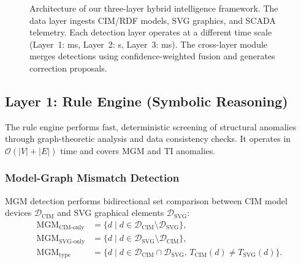 \documentclass[research]{fcs}
\begin{document}
\begin{figure}[htbp]
\caption{\small Architecture of our three-layer hybrid intelligence framework. The data layer ingests CIM/RDF models, SVG graphics, and SCADA telemetry. Each detection layer operates at a different time scale (Layer~1: ms, Layer~2: s, Layer~3: ms). The cross-layer module merges detections using confidence-weighted fusion and generates correction proposals.}
\label{fig:framework}
\end{figure}

\subsection{Layer 1: Rule Engine (Symbolic Reasoning)}

The rule engine performs fast, deterministic screening of structural anomalies through graph-theoretic analysis and data consistency checks. It operates in $\mathcal{O}(|V| + |E|)$ time and covers MGM and TI anomalies.

\subsubsection{Model-Graph Mismatch Detection}

MGM detection performs bidirectional set comparison between CIM model devices $\mathcal{D}_{\text{CIM}}$ and SVG graphical elements $\mathcal{D}_{\text{SVG}}$:
\begin{align}
\text{MGM}_{\text{CIM-only}} &= \{d \mid d \in \mathcal{D}_{\text{CIM}} \setminus \mathcal{D}_{\text{SVG}}\}, \\
\text{MGM}_{\text{SVG-only}} &= \{d \mid d \in \mathcal{D}_{\text{SVG}} \setminus \mathcal{D}_{\text{CIM}}\}, \\
\text{MGM}_{\text{type}} &= \{d \mid d \in \mathcal{D}_{\text{CIM}} \cap \mathcal{D}_{\text{SVG}},\, T_{\text{CIM}}(d) \neq T_{\text{SVG}}(d)\}.
\end{align}
\end{document}
